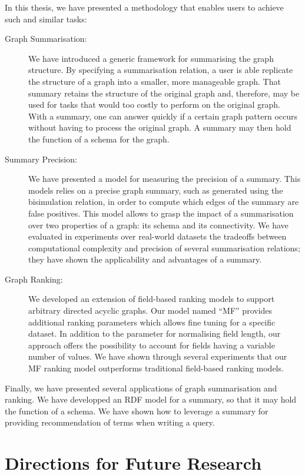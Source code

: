 In this thesis, we have presented a methodology that enables users to achieve such and similar tasks:
\begin{description}
	\item[Graph Summarisation:] We have introduced a generic framework for summarising the graph structure. By specifying a summarisation relation, a user is able replicate the structure of a graph into a smaller, more manageable graph. That summary retains the structure of the original graph and, therefore, may be used for tasks that would too costly to perform on the original graph. With a summary, one can answer quickly if a certain graph pattern occurs without having to process the original graph. A summary may then hold the function of a schema for the graph.
	\item[Summary Precision:] We have presented a model for measuring the precision of a summary. This models relies on a precise graph summary, such as generated using the bisimulation relation, in order to compute which edges of the summary are false positives. This model allows to grasp the impact of a summarisation over two properties of a graph: its schema and its connectivity. We have evaluated in experiments over real-world datasets the tradeoffs between computational complexity and precision of several summarisation relations; they have shown the applicability and advantages of a summary.
	\item[Graph Ranking:] We developed an extension of field-based ranking models to support arbitrary directed acyclic graphs. Our model named ``MF'' provides additional ranking parameters which allows fine tuning for a specific dataset. In addition to the parameter for normalising field length, our approach offers the possibility to account for fields having a variable number of values. We have shown through several experiments that our \gls{MF} ranking model outperforms traditional field-based ranking models.
\end{description}
Finally, we have presented several applications of graph summarisation and ranking. We have developped an RDF model for a summary, so that it may hold the function of a schema. We have shown how to leverage a summary for providing recommendation of terms when writing a query.

\section{Directions for Future Research}

